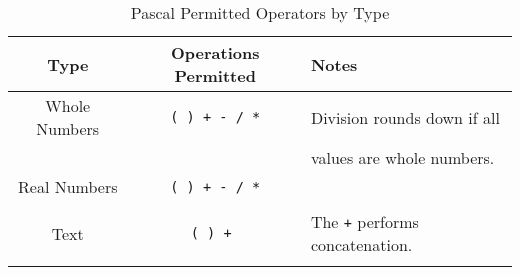 \begin{table}[h]
  \centering
  \begin{tabular}{|c|c|l|}
    \hline
    \textbf{Type} & \textbf{Operations Permitted} & \textbf{Notes}\\
    \hline
    Whole Numbers     &   \texttt{( ) + - / *} & Division rounds down if all\\
                                    &                        & values are whole numbers.\\
    Real Numbers   &   \texttt{( ) + - / *} &    \\
       & & \\
    Text           &   \texttt{( ) + }          & The \texttt{+} performs concatenation.\\
       & & \\
    \hline
  \end{tabular}
  \caption{Pascal Permitted Operators by Type}
  \label{tbl:program-creation-pas operators by type}
\end{table}

